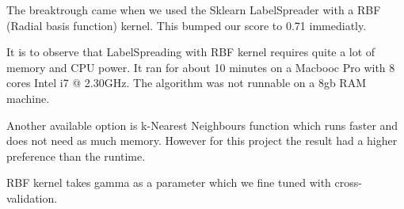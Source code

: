 \documentclass[a4paper, 11pt]{article}
\begin{document}
The breaktrough came when we used the Sklearn LabelSpreader with a RBF (Radial basis function) kernel. This bumped our score to 0.71 immediatly.

It is to observe that LabelSpreading with RBF kernel requires quite a lot of memory and CPU power. It ran for about 10 minutes on a Macbooc Pro with 8 cores Intel i7 @ 2.30GHz. The algorithm was not runnable on a 8gb RAM machine.

Another available option is k-Nearest Neighbours function which runs faster and does not need as much memory. However for this project the result had a higher preference than the runtime.

RBF kernel takes gamma as a parameter which we fine tuned with cross-validation.
\end{document}
